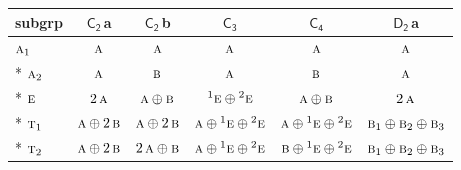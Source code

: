 \documentclass[10pt,a4paper]{article}
\numberwithin{equation}{section}
\newcommand{\grp}[1]{\mathsf{#1}}
\newcommand{\irr}[1]{\text{\normalfont\scshape #1}}
\newcommand{\conjpair}[1]{{}^{#1}}
\newcommand{\clsletter}[1]{\,{\scriptsize\color{black!55}#1}}
\begin{document}
{\small\begin{longtable}{@{}lccccc@{}}\toprule
subgrp & \href{C2.pdf}{$\grp{C_{2}}$}\clsletter{a} & \href{C2.pdf}{$\grp{C_{2}}$}\clsletter{b} & \href{C3.pdf}{$\grp{C_{3}}$} & \href{C4.pdf}{$\grp{C_{4}}$} & \href{D2.pdf}{$\grp{D_{2}}$}\clsletter{a}\\\midrule\endhead
\bottomrule\endfoot\endlastfoot
$\irr{a}_{1}$ & $\irr{a}$ & $\irr{a}$ & $\irr{a}$ & $\irr{a}$ & $\irr{a}$\\*
$\irr{a}_{2}$ & $\irr{a}$ & $\irr{b}$ & $\irr{a}$ & $\irr{b}$ & $\irr{a}$\\*
$\irr{e}$ & $2\,\irr{a}$ & $\irr{a}\oplus \irr{b}$ & $\conjpair{1}\irr{e}\oplus \conjpair{2}\irr{e}$ & $\irr{a}\oplus \irr{b}$ & $2\,\irr{a}$\\*
$\irr{t}_{1}$ & $\irr{a}\oplus 2\,\irr{b}$ & $\irr{a}\oplus 2\,\irr{b}$ & $\irr{a}\oplus \conjpair{1}\irr{e}\oplus \conjpair{2}\irr{e}$ & $\irr{a}\oplus \conjpair{1}\irr{e}\oplus \conjpair{2}\irr{e}$ & $\irr{b}_{1}\oplus \irr{b}_{2}\oplus \irr{b}_{3}$\\*
$\irr{t}_{2}$ & $\irr{a}\oplus 2\,\irr{b}$ & $2\,\irr{a}\oplus \irr{b}$ & $\irr{a}\oplus \conjpair{1}\irr{e}\oplus \conjpair{2}\irr{e}$ & $\irr{b}\oplus \conjpair{1}\irr{e}\oplus \conjpair{2}\irr{e}$ & $\irr{b}_{1}\oplus \irr{b}_{2}\oplus \irr{b}_{3}$\\
\bottomrule\end{longtable}}
\end{document}
